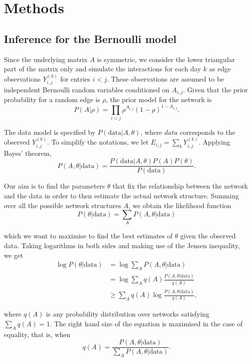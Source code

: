 \documentclass[]{article}
\begin{document}
\hypertarget{methods}{%
\section{Methods}\label{methods}}

\hypertarget{inference-for-the-bernoulli-model}{%
\subsection{Inference for the Bernoulli
model}\label{inference-for-the-bernoulli-model}}

Since the underlying matrix \(A\) is symmetric, we consider the lower
triangular part of the matrix only and simulate the interactions for
each day \(k\) as edge observations \(Y_{i,j}^{(k)}\) for entries
\(i<j\). These observations are assumed to be independent Bernoulli
random variables conditioned on \(A_{i,j}\). Given that the prior
probability for a random edge is \(\rho\), the prior model for the
network is \[P(A|\rho)=\prod_{i<j}\rho^{A_{i,j}}(1-\rho)^{1-A_{i,j}}.\]

The data model is specified by \(P(\mbox{data}|A, \theta)\), where
\(data\) corresponds to the observed \(Y_{i,j}^{(k)}\). To simplify the
notations, we let \(E_{i,j}=\sum_kY_{i,j}^{(k)}\). Applying Bayes'
theorem,
\[P(A,\theta|\mbox{data})=\frac{P(\mbox{data}|A,\theta)P(A)P(\theta)}{P(\mbox{data})}.\]

Our aim is to find the parameters \(\theta\) that fix the relationship
between the network and the data in order to then estimate the actual
network structure. Summing over all the possible network structures
\(A\), we obtain the likelihood function
\[P(\theta|\mbox{data})=\sum_{A}{P(A,\theta|\mbox{data})}\]

which we want to maximise to find the best estimates of \(\theta\) given
the observed data. Taking logarithms in both sides and making use of the
Jensen inequality, we get \[\begin{aligned}
\log P(\theta|\mbox{data}) &= \log \sum_{A}{P(A,\theta|\mbox{data})} \\
                          &= \log \sum_{A} q(A)\frac{P(A,\theta|\mbox{data})}{q(A)} \\
                          &\geq \sum_{A} q(A) \log \frac{P(A,\theta|\mbox{data})}{q(A)},
\end{aligned}\]

where \(q(A)\) is any probability distribution over networks satisfying
\(\sum_{A}q(A)=1.\) The right hand size of the equation is maximised in
the case of equality, that is, when
\[q(A)=\frac{P(A,\theta|\mbox{data})}{ \sum_{A}P(A,\theta|\mbox{data})}.\]
\end{document}
